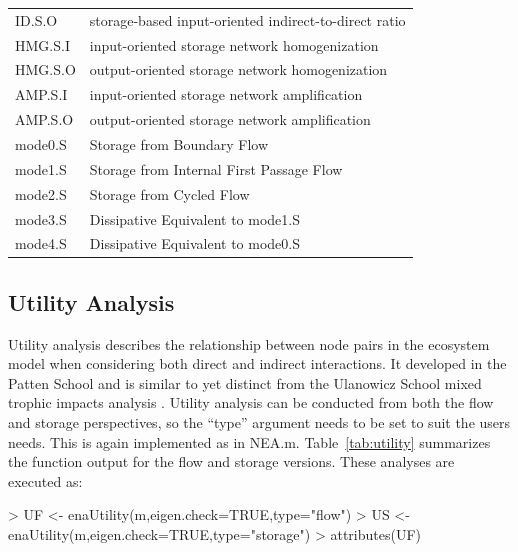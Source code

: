 \documentclass[article]{jss}
\begin{document}
\begin{table}[]
\begin{small}
\begin{tabular}{l l}
      ID.S.O & storage-based input-oriented indirect-to-direct ratio \citep[as in][]{fath06}\\
      HMG.S.I & input-oriented storage network homogenization \\
      HMG.S.O & output-oriented storage network homogenization\\
      AMP.S.I &  input-oriented storage network amplification \\
      AMP.S.O & output-oriented storage network amplification \\
      mode0.S & Storage from Boundary Flow \\
      mode1.S & Storage from Internal First Passage Flow \\
      mode2.S & Storage from Cycled Flow \\
      mode3.S & Dissipative Equivalent to mode1.S \\
      mode4.S & Dissipative Equivalent to mode0.S \\ \hline
    \end{tabular}
\end{small}
\end{table}

\subsection{Utility Analysis}
Utility analysis describes the relationship between node pairs in the
ecosystem model when considering both direct and indirect
interactions.  It developed in the Patten School \citep{patten91,
  fath99_review} and is similar to yet distinct from the Ulanowicz
School mixed trophic impacts analysis \citep{ulanowicz90}.  Utility
analysis can be conducted from both the flow and storage perspectives,
so the ``type'' argument needs to be set to suit the users needs.
This is again implemented as in NEA.m.  Table~\ref{tab:utility}
summarizes the function output for the flow and storage
versions. These analyses are executed as:

\begin{Schunk}
\begin{Sinput}
> UF <- enaUtility(m,eigen.check=TRUE,type="flow")
> US <- enaUtility(m,eigen.check=TRUE,type="storage")
> attributes(UF)
\end{Sinput}
\end{Schunk}
\end{document}

